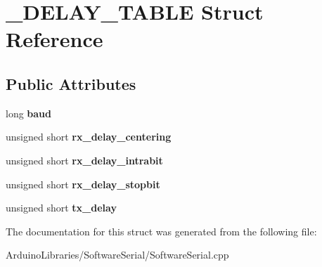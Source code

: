 \hypertarget{struct___d_e_l_a_y___t_a_b_l_e}{}\section{\+\_\+\+D\+E\+L\+A\+Y\+\_\+\+T\+A\+B\+L\+E Struct Reference}
\label{struct___d_e_l_a_y___t_a_b_l_e}
\subsection*{Public Attributes}
\begin{DoxyCompactItemize}
\item 
\hypertarget{struct___d_e_l_a_y___t_a_b_l_e_a81dc0c3fb2cc8893f4666f23f8db9eca}{}long {\bfseries baud}\label{struct___d_e_l_a_y___t_a_b_l_e_a81dc0c3fb2cc8893f4666f23f8db9eca}

\item 
\hypertarget{struct___d_e_l_a_y___t_a_b_l_e_a51aab1d8b68a8ea27646618a30b0e938}{}unsigned short {\bfseries rx\+\_\+delay\+\_\+centering}\label{struct___d_e_l_a_y___t_a_b_l_e_a51aab1d8b68a8ea27646618a30b0e938}

\item 
\hypertarget{struct___d_e_l_a_y___t_a_b_l_e_a8b81bfff2b179bdc4b6cd2f57df74e8f}{}unsigned short {\bfseries rx\+\_\+delay\+\_\+intrabit}\label{struct___d_e_l_a_y___t_a_b_l_e_a8b81bfff2b179bdc4b6cd2f57df74e8f}

\item 
\hypertarget{struct___d_e_l_a_y___t_a_b_l_e_a459c08839bc23ed1e22b146f7f3ce13d}{}unsigned short {\bfseries rx\+\_\+delay\+\_\+stopbit}\label{struct___d_e_l_a_y___t_a_b_l_e_a459c08839bc23ed1e22b146f7f3ce13d}

\item 
\hypertarget{struct___d_e_l_a_y___t_a_b_l_e_a20098fe273924c2456690a6ea96dc891}{}unsigned short {\bfseries tx\+\_\+delay}\label{struct___d_e_l_a_y___t_a_b_l_e_a20098fe273924c2456690a6ea96dc891}

\end{DoxyCompactItemize}


The documentation for this struct was generated from the following file\+:\begin{DoxyCompactItemize}
\item 
Arduino\+Libraries/\+Software\+Serial/Software\+Serial.\+cpp\end{DoxyCompactItemize}
